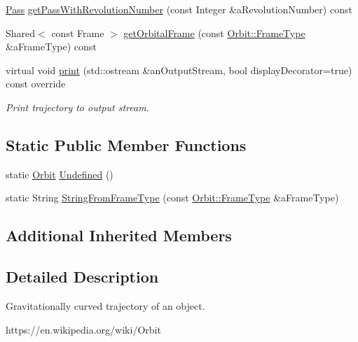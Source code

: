 \begin{DoxyCompactItemize}
\item 
\hyperlink{classlibrary_1_1astro_1_1trajectory_1_1orbit_1_1_pass}{Pass} \hyperlink{classlibrary_1_1astro_1_1trajectory_1_1_orbit_a08833197c8d3774bf4436c1fb68c77ae}{get\+Pass\+With\+Revolution\+Number} (const Integer \&a\+Revolution\+Number) const
\item 
Shared$<$ const Frame $>$ \hyperlink{classlibrary_1_1astro_1_1trajectory_1_1_orbit_a0360f97e0b144d175477a4bd11db1beb}{get\+Orbital\+Frame} (const \hyperlink{classlibrary_1_1astro_1_1trajectory_1_1_orbit_a816e83a0c220d4242ce2bebd32191cd8}{Orbit\+::\+Frame\+Type} \&a\+Frame\+Type) const
\item 
virtual void \hyperlink{classlibrary_1_1astro_1_1trajectory_1_1_orbit_ac3b8c212e5b66822ab7eb09785a6c228}{print} (std\+::ostream \&an\+Output\+Stream, bool display\+Decorator=true) const override
\begin{DoxyCompactList}\small\item\em Print trajectory to output stream. \end{DoxyCompactList}\end{DoxyCompactItemize}
\subsection*{Static Public Member Functions}
\begin{DoxyCompactItemize}
\item 
static \hyperlink{classlibrary_1_1astro_1_1trajectory_1_1_orbit}{Orbit} \hyperlink{classlibrary_1_1astro_1_1trajectory_1_1_orbit_a1623802ee44bab50e24f3c1979bb5001}{Undefined} ()
\item 
static String \hyperlink{classlibrary_1_1astro_1_1trajectory_1_1_orbit_a302ee3d55713b92cc112f747f7a1b1a2}{String\+From\+Frame\+Type} (const \hyperlink{classlibrary_1_1astro_1_1trajectory_1_1_orbit_a816e83a0c220d4242ce2bebd32191cd8}{Orbit\+::\+Frame\+Type} \&a\+Frame\+Type)
\end{DoxyCompactItemize}
\subsection*{Additional Inherited Members}


\subsection{Detailed Description}
Gravitationally curved trajectory of an object. 

https\+://en.wikipedia.\+org/wiki/\+Orbit 

